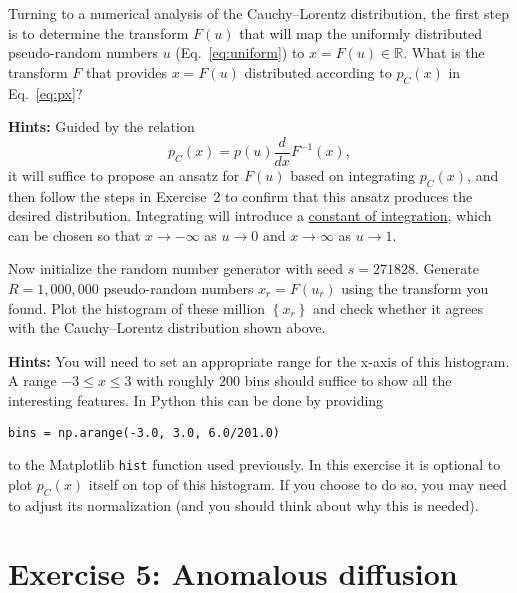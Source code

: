 \documentclass[12 pt]{article} %
\newcommand{\Rbb}{\ensuremath{\mathbb R} }
\newcommand{\eq}[1]{Eq.~\ref{#1}}
\newcommand{\showmarks}[1]{\rightline{\texttt{[#1 marks]}}} %
\begin{document}
\showmarks{6}

Turning to a numerical analysis of the Cauchy--Lorentz distribution, the first step is to determine the transform $F(u)$ that will map the uniformly distributed pseudo-random numbers $u$ (\eq{eq:uniform}) to $x = F(u) \in \Rbb$.
What is the transform $F$ that provides $x = F(u)$ distributed according to $p_C(x)$ in \eq{eq:px}?

\textbf{Hints:} Guided by the relation
\begin{equation*}
  p_C(x) = p(u) \frac{d}{dx} F^{-1}(x),
\end{equation*}
it will suffice to propose an ansatz for $F(u)$ based on integrating $p_C(x)$, and then follow the steps in Exercise~2 to confirm that this ansatz produces the desired distribution.
Integrating will introduce a \href{https://en.wikipedia.org/wiki/Constant_of_integration}{constant of integration}, which can be chosen so that $x \to -\infty$ as $u \to 0$ and $x \to \infty$ as $u \to 1$.

\showmarks{6}

Now initialize the random number generator with seed $s = 271828$.
Generate $R = 1{,}000{,}000$ pseudo-random numbers $x_r = F(u_r)$ using the transform you found.
Plot the histogram of these million $\left\{x_r\right\}$ and check whether it agrees with the Cauchy--Lorentz distribution shown above.

\textbf{Hints:} You will need to set an appropriate range for the x-axis of this histogram.
A range $-3 \leq x \leq 3$ with roughly $200$ bins should suffice to show all the interesting features.
In Python this can be done by providing \\
\centerline{\texttt{bins = np.arange(-3.0, 3.0, 6.0/201.0)}}
to the Matplotlib \texttt{hist} function used previously.
In this exercise it is optional to plot $p_C(x)$ itself on top of this histogram.
If you choose to do so, you may need to adjust its normalization (and you should think about why this is needed).

\showmarks{8}



\section*{Exercise 5: Anomalous diffusion}
\end{document}
